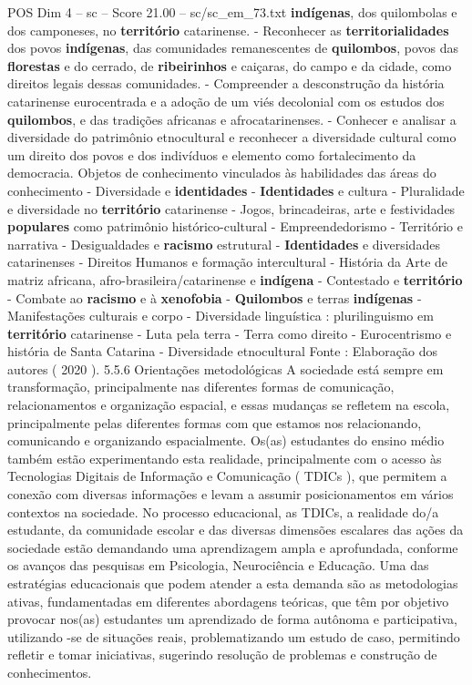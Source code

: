 \begin{textsample}{POS Dim 4 – sc – Score 21.00 – sc/sc\_em\_73.txt}
\textbf{indígenas}, dos quilombolas e dos camponeses, no \textbf{território} catarinense. - Reconhecer as \textbf{territorialidades} dos povos \textbf{indígenas}, das comunidades remanescentes de \textbf{quilombos}, povos das \textbf{florestas} e do cerrado, de \textbf{ribeirinhos} e caiçaras, do campo e da cidade, como direitos legais dessas comunidades. - Compreender a desconstrução da história catarinense eurocentrada e a adoção de um viés decolonial com os estudos dos \textbf{quilombos}, e das tradições africanas e afrocatarinenses. - Conhecer e analisar a diversidade do patrimônio etnocultural e reconhecer a diversidade cultural como um direito dos povos e dos indivíduos e elemento como fortalecimento da democracia.
Objetos de conhecimento vinculados às habilidades das áreas do conhecimento - Diversidade e \textbf{identidades} - \textbf{Identidades} e cultura - Pluralidade e diversidade no \textbf{território} catarinense - Jogos, brincadeiras, arte e festividades \textbf{populares} como patrimônio histórico-cultural - Empreendedorismo - Território e narrativa - Desigualdades e \textbf{racismo} estrutural - \textbf{Identidades} e diversidades catarinenses - Direitos Humanos e formação intercultural - História da Arte de matriz africana, afro-brasileira/catarinense e \textbf{indígena} - Contestado e \textbf{território} - Combate ao \textbf{racismo} e à \textbf{xenofobia} - \textbf{Quilombos} e terras \textbf{indígenas} - Manifestações culturais e corpo - Diversidade linguística : plurilinguismo em \textbf{território} catarinense - Luta pela terra - Terra como direito - Eurocentrismo e história de Santa Catarina - Diversidade etnocultural Fonte : Elaboração dos autores ( 2020 ). 5.5.6 Orientações metodológicas A sociedade está sempre em transformação, principalmente nas diferentes formas de comunicação, relacionamentos e organização espacial, e essas mudanças se refletem na escola, principalmente pelas diferentes formas com que estamos nos relacionando, comunicando e organizando espacialmente.
Os(as) estudantes do ensino médio também estão experimentando esta realidade, principalmente com o acesso às Tecnologias Digitais de Informação e Comunicação ( TDICs ), que permitem a conexão com diversas informações e levam a assumir posicionamentos em vários contextos na sociedade.
No processo educacional, as TDICs, a realidade do/a estudante, da comunidade escolar e das diversas dimensões escalares das ações da sociedade estão demandando uma aprendizagem ampla e aprofundada, conforme os avanços das pesquisas em Psicologia, Neurociência e Educação.
Uma das estratégias educacionais que podem atender a esta demanda são as metodologias ativas, fundamentadas em diferentes abordagens teóricas, que têm por objetivo provocar nos(as) estudantes um aprendizado de forma autônoma e participativa, utilizando -se de situações reais, problematizando um estudo de caso, permitindo refletir e tomar iniciativas, sugerindo resolução de problemas e construção de conhecimentos.

\end{textsample}
